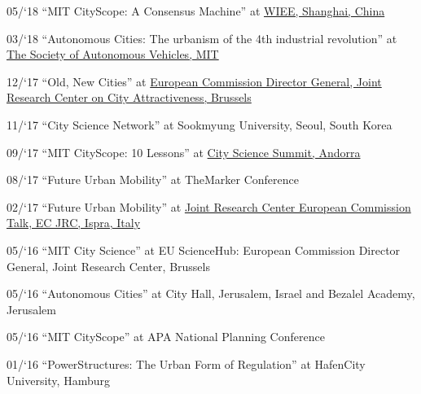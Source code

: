 \begin{tablist}
    \item[05/`18] \tab \enquote{MIT CityScope: A Consensus Machine} at
    \href{https://wiee.tongji.edu.cn/CSS2018/}{WIEE, Shanghai, China}

    \item[03/`18] \tab \enquote{Autonomous Cities: The urbanism of the 4th industrial revolution} at \href{http://cameraculture.media.mit.edu/category/blog/}{The Society of Autonomous Vehicles, MIT}

    \item[12/`17] \tab \enquote{Old, New Cities} at \href{https://www.youtube.com/watch?v=AW-ljDEleLw}{European Commission Director General, Joint Research Center on City Attractiveness, Brussels}

    \item[11/`17] \tab \enquote{City Science Network} at {Sookmyung University, Seoul, South Korea}

    \item[09/`17] \tab \enquote{MIT CityScope: 10 Lessons} at \href{https://www.youtube.com/watch?v=bRNbap13I5w}{City Science Summit, Andorra}


    \item[08/`17] \tab \enquote{Future Urban Mobility} at {TheMarker Conference}

    \item[02/`17] \tab \enquote{Future Urban Mobility} at \href{https://ec.europa.eu/jrc/en/event/conference/14th-jrc-annual-training-composite-indicators-and-scoreboards} {Joint Research Center European Commission Talk, EC JRC, Ispra, Italy}

    \item[05/`16] \tab \enquote{MIT City Science} at {EU ScienceHub:
        European Commission Director General, Joint Research Center, Brussels}

    \item[05/`16] \tab \enquote{Autonomous Cities} at {City Hall, Jerusalem, Israel and Bezalel Academy, Jerusalem}


    \item[05/`16] \tab \enquote{MIT CityScope} at {APA National Planning Conference}

    \item[01/`16] \tab \enquote{PowerStructures: The Urban Form of Regulation} at {HafenCity University, Hamburg}

\end{tablist}

